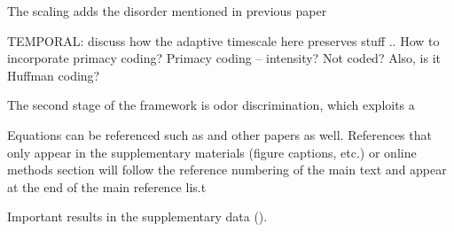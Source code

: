 The scaling adds the disorder mentioned in previous paper

TEMPORAL: discuss how the adaptive timescale here preserves stuff .. How to incorporate primacy coding?
Primacy coding -- intensity? Not coded? Also, is it Huffman coding?

The second stage of the framework is odor discrimination, which exploits a 



Equations can be referenced such as  and other papers as well. References
that only appear in the supplementary materials (figure captions, etc.) or online methods section
will follow the reference numbering of the main text and appear at the end of the main reference
lis.t

Important results in the supplementary data ().
